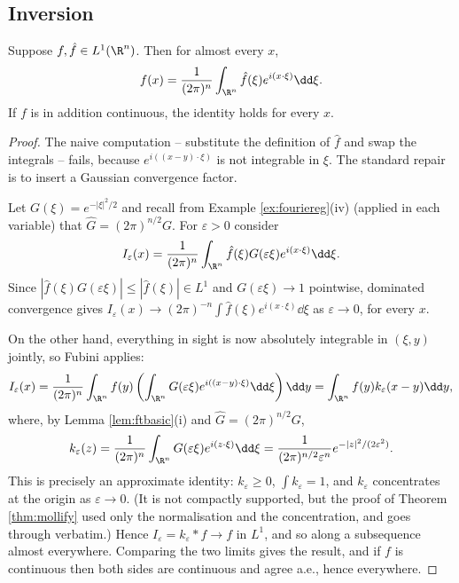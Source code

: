 \subsection{Inversion}

\begin{theorem}\label{thm:ftinv}
	Suppose $f, \hat f \in L^1(\R^n)$. Then for almost every $x$,
	$$f(x) = \frac{1}{(2\pi)^n}\int_{\R^n}\hat f(\xi)e^{i(x\cdot\xi)}\dd \xi.$$
	If $f$ is in addition continuous, the identity holds for every $x$.
\end{theorem}

\begin{proof}
	The naive computation -- substitute the definition of $\hat f$ and swap the integrals -- fails, because $e^{i((x-y)\cdot\xi)}$ is not integrable in $\xi$. The standard repair is to insert a Gaussian convergence factor.

	Let $G(\xi) = e^{-|\xi|^2/2}$ and recall from Example \ref{ex:fouriereg}(iv) (applied in each variable) that $\hat G = (2\pi)^{n/2}G$. For $\varepsilon > 0$ consider
	$$I_\varepsilon(x) = \frac{1}{(2\pi)^n}\int_{\R^n} \hat f(\xi)G(\varepsilon\xi)e^{i(x\cdot\xi)}\dd\xi.$$
	Since $|\hat f(\xi)G(\varepsilon\xi)|\le|\hat f(\xi)| \in L^1$ and $G(\varepsilon\xi)\to 1$ pointwise, dominated convergence gives $I_\varepsilon(x) \to (2\pi)^{-n}\int \hat f(\xi)e^{i(x\cdot\xi)}\dd\xi$ as $\varepsilon\to 0$, for every $x$.

	On the other hand, everything in sight is now absolutely integrable in $(\xi,y)$ jointly, so Fubini applies:
	$$I_\varepsilon(x) = \frac{1}{(2\pi)^n}\int_{\R^n} f(y)\left( \int_{\R^n}G(\varepsilon\xi)e^{i((x-y)\cdot\xi)}\dd\xi\right)\dd y = \int_{\R^n}f(y)k_\varepsilon(x-y)\dd y,$$
	where, by Lemma \ref{lem:ftbasic}(i) and $\hat G = (2\pi)^{n/2}G$,
	$$k_\varepsilon(z) = \frac{1}{(2\pi)^n}\int_{\R^n}G(\varepsilon\xi)e^{i(z\cdot\xi)}\dd\xi = \frac{1}{(2\pi)^{n/2}\varepsilon^n}e^{-|z|^2/(2\varepsilon^2)}.$$
	This is precisely an approximate identity: $k_\varepsilon \ge 0$, $\int k_\varepsilon = 1$, and $k_\varepsilon$ concentrates at the origin as $\varepsilon \to 0$. (It is not compactly supported, but the proof of Theorem \ref{thm:mollify} used only the normalisation and the concentration, and goes through verbatim.) Hence $I_\varepsilon = k_\varepsilon * f \to f$ in $L^1$, and so along a subsequence almost everywhere. Comparing the two limits gives the result, and if $f$ is continuous then both sides are continuous and agree a.e., hence everywhere.
\end{proof}

